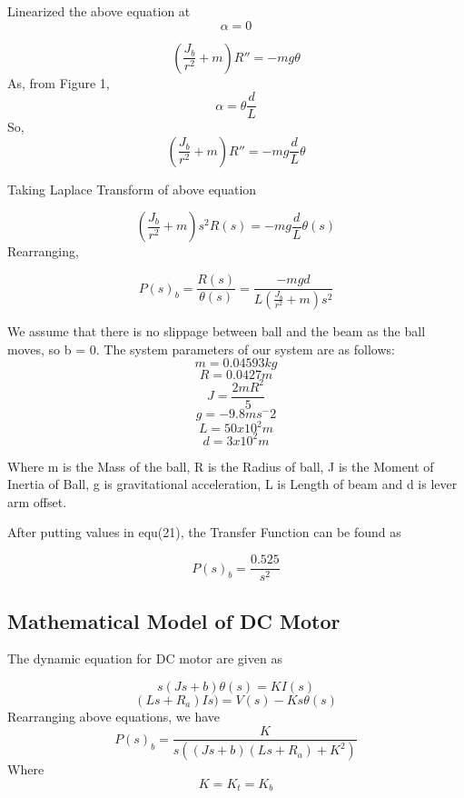 \documentclass{article}
\begin{document}
Linearized the above equation at \[\alpha = 0\]

\begin{equation} \label{eq:1}
  (\frac{J_b}{r^2} + m) R'' = - mg\theta 
\end{equation}
As, from Figure 1, \[\alpha = \theta \frac{d}{L} \]
So,
\begin{equation} \label{eq:1}
  (\frac{J_b}{r^2} + m) R'' = - mg\frac{d}{L} \theta
\end{equation}

Taking Laplace Transform of above equation

\begin{equation} \label{eq:1}
  (\frac{J_b}{r^2} + m) s^2 R(s) = - mg\frac{d}{L} \theta(s)
\end{equation}
Rearranging,

\begin{equation} \label{eq:1}
P(s)_b = \frac{R(s)}{\theta(s)} = \frac{-mgd}{L (\frac{J_b}{r^2} + m) s^2} 
\end{equation}

We assume that there is no slippage between ball and the beam as the ball moves, so b = 0. The system parameters of our system are as follows:
\[ m = 0.04593 kg\]
\[ R = 0.0427 m\]
\[ J = \frac{2mR^2}{5} \]
\[ g = -9.8 ms^-2 \]
\[ L = 50 x 10^2 m\]
\[ d = 3 x 10^2 m\]

Where m is the Mass of the ball, R is the Radius of ball, J is the Moment of Inertia of Ball, g is gravitational acceleration, L is Length of beam and d is lever arm offset.

After putting values in equ(21), the Transfer Function can be found as

\begin{equation} \label{eq:1}
P(s)_b = \frac{0.525}{s^2}
\end{equation}

\subsection{Mathematical Model of DC Motor}
The dynamic equation for DC motor are given as

\begin{equation} \label{eq:1}
  s(Js+b) \theta(s) = KI(s) 
\end{equation}
\begin{equation} \label{eq:1}
  (Ls+R_a) Is) = V(s) -Ks\theta(s)
\end{equation}
Rearranging above equations, we have
\begin{equation} \label{eq:1}
 P(s)_b = \frac{K}{s((Js+b)(Ls+R_a)+K^2)} 
 \end{equation}
Where \[K = K_t = K_b\]
\end{document}
